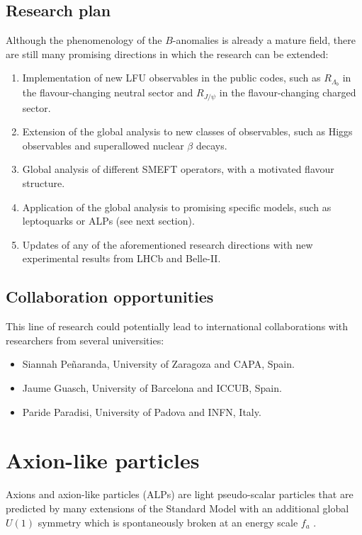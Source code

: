 \documentclass[combined.tex]{subfiles}
\begin{document}
\subsection{Research plan}
Although the phenomenology of the $B$-anomalies is already a mature field, there are still many promising directions in which the research can be extended:
\begin{enumerate}
\item Implementation of new LFU observables in the public codes, such as $R_{\Lambda_b}$ in the flavour-changing neutral sector and $R_{J/\psi}$ in the flavour-changing charged sector.
\item Extension of the global analysis to new classes of observables, such as Higgs observables and superallowed nuclear $\beta$ decays.
\item Global analysis of different SMEFT operators, with a motivated flavour structure.
\item Application of the global analysis to promising specific models, such as leptoquarks or ALPs (see next section). 
\item Updates of any of the aforementioned research directions with new experimental results from LHCb and Belle-II.
\end{enumerate}

\subsection{Collaboration opportunities}
This line of research could potentially lead to international collaborations with researchers from several universities:
\begin{itemize}
\item Siannah Peñaranda, University of Zaragoza and CAPA, Spain.
\item Jaume Guasch, University of Barcelona and ICCUB, Spain.
\item Paride Paradisi, University of Padova and INFN, Italy.
\end{itemize}

\section{Axion-like particles}
Axions and axion-like particles (ALPs) are light pseudo-scalar particles that are predicted by many extensions of the Standard Model with an additional global $U(1)$ symmetry which is spontaneously broken at an energy scale $f_a$ \cite{Peccei:1977hh,Wilczek:1977pj,Weinberg:1977ma}. 
\end{document}
